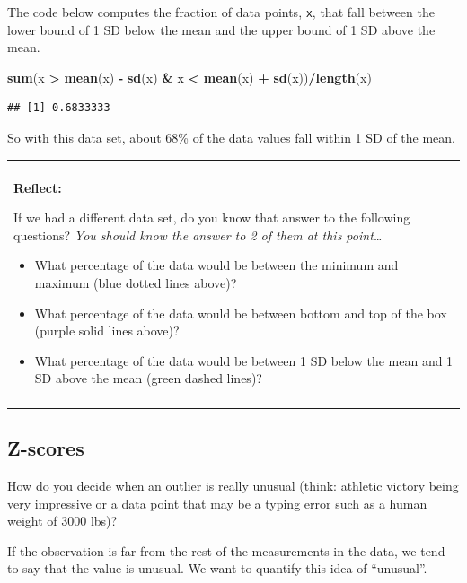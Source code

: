 \documentclass[
]{book}
\newenvironment{Shaded}{\begin{snugshade}}{\end{snugshade}}
\newcommand{\KeywordTok}[1]{\textcolor[rgb]{0.13,0.29,0.53}{\textbf{#1}}}
\newcommand{\NormalTok}[1]{#1}
\newcommand{\OperatorTok}[1]{\textcolor[rgb]{0.81,0.36,0.00}{\textbf{#1}}}
\newcommand{\StringTok}[1]{\textcolor[rgb]{0.31,0.60,0.02}{#1}}
\newenvironment{reflect}
{
    \begin{center}
    
    \begin{tabular}{|p{0.8\textwidth}|}
    \rowcolor{LightBlue}
    \hline\\
    \rowcolor{LightBlue}
    \textbf{Reflect:}
}
{
    \\\rowcolor{LightBlue}
    \\\hline
    \end{tabular} 
    \end{center}
}
\begin{document}
The code below computes the fraction of data points, \texttt{x}, that fall between the lower bound of 1 SD below the mean and the upper bound of 1 SD above the mean.

\begin{Shaded}
\begin{Highlighting}[]
\KeywordTok{sum}\NormalTok{(x }\OperatorTok{>}\StringTok{ }\KeywordTok{mean}\NormalTok{(x) }\OperatorTok{-}\StringTok{ }\KeywordTok{sd}\NormalTok{(x) }\OperatorTok{&}\StringTok{ }\NormalTok{x }\OperatorTok{<}\StringTok{ }\KeywordTok{mean}\NormalTok{(x) }\OperatorTok{+}\StringTok{ }\KeywordTok{sd}\NormalTok{(x))}\OperatorTok{/}\KeywordTok{length}\NormalTok{(x)}
\end{Highlighting}
\end{Shaded}

\begin{verbatim}
## [1] 0.6833333
\end{verbatim}

So with this data set, about 68\% of the data values fall within 1 SD of the mean.

\begin{reflect}
If we had a different data set, do you know that answer to the following
questions? \emph{You should know the answer to 2 of them at this
point\ldots{}}

\begin{itemize}
\item
  What percentage of the data would be between the minimum and maximum
  (blue dotted lines above)?
\item
  What percentage of the data would be between bottom and top of the box
  (purple solid lines above)?
\item
  What percentage of the data would be between 1 SD below the mean and 1
  SD above the mean (green dashed lines)?
\end{itemize}
\end{reflect}

\hypertarget{z-scores}{%
\subsection{Z-scores}\label{z-scores}}

How do you decide when an outlier is really unusual (think: athletic victory being very impressive or a data point that may be a typing error such as a human weight of 3000 lbs)?

If the observation is far from the rest of the measurements in the data, we tend to say that the value is unusual. We want to quantify this idea of ``unusual''.
\end{document}
